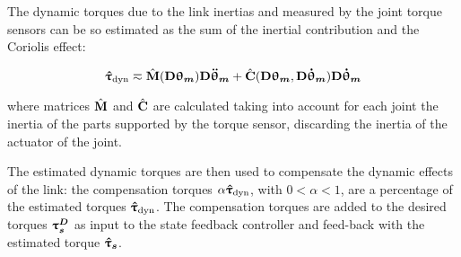 The dynamic torques due to the link inertias and measured by the joint torque sensors can be so estimated as the sum of the inertial contribution and the Coriolis effect:

\begin{equation}
{ \boldsymbol {\hat{\uptau}_{\text{dyn}}}}  \eqsim \hat{\mathbf{M}}(\mathbf{D} { \boldsymbol {\uptheta_m}}) \mathbf{D} { \boldsymbol {\ddot{\uptheta}_m}}+\hat{\mathbf{C}}(\mathbf{D} { \boldsymbol {\uptheta_m}},\mathbf{D} { \boldsymbol {\dot{\uptheta}_m}})\mathbf{D} { \boldsymbol {\dot{\uptheta}_m}}
\end{equation}

where matrices $\hat{\mathbf{M}}$ and $\hat{\mathbf{C}}$ are calculated taking into account for each joint the inertia of the parts supported by the torque sensor, discarding the inertia of the actuator of the joint.

The estimated dynamic torques are then used to compensate the dynamic effects of the link: the compensation torques $\alpha { \boldsymbol {\hat{\uptau}_{\text{dyn}}}} $, with $0<\alpha<1$, are a percentage of the estimated torques ${ \boldsymbol {\hat{\uptau}_{\text{dyn}}}} $. The compensation torques are added to the desired torques ${ \boldsymbol {\uptau_s^D}}$ as input to the state feedback controller and feed-back with the estimated torque ${ \boldsymbol {\hat{\uptau}_s}}$. 